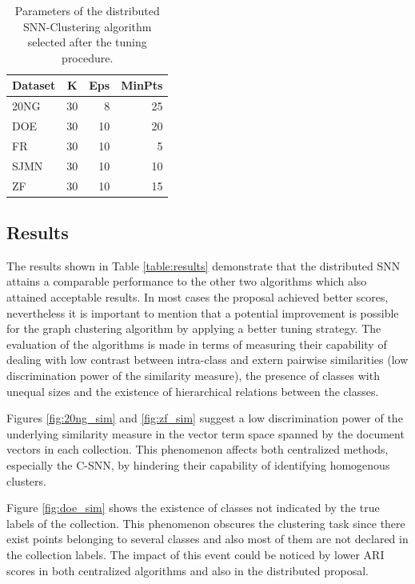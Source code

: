 \documentclass[a4paper]{article}
\begin{document}
\begin{table}[!htbp]
\centering
\begin{tabular}{l|crr}
\textbf{Dataset} & \textbf{K} & \textbf{Eps} & \textbf{MinPts} \\ \hline
20NG    & 30& 8 & 25 \\
DOE     & 30& 10& 20 \\
FR      & 30& 10& 5  \\
SJMN    & 30& 10& 10 \\
ZF      & 30& 10& 15 \\ \hline
\end{tabular}
\caption{Parameters of the distributed SNN-Clustering algorithm selected after the tuning procedure.}
\label{table:distributedsnn_params}
\end{table}


\subsection*{Results}
The results shown in Table \ref{table:results} demonstrate that the distributed SNN attains a comparable performance to the other two algorithms which also attained acceptable results. In most cases the proposal achieved better scores, nevertheless it is important to mention that a potential improvement is possible for the graph clustering algorithm by applying a better tuning strategy. 
The  evaluation of the algorithms is made in terms of measuring their capability of dealing with low contrast between intra-class and extern pairwise similarities (low discrimination power of the similarity measure), the presence of classes with unequal sizes and the existence of hierarchical relations between the classes.


Figures \ref{fig:20ng_sim} and \ref{fig:zf_sim} suggest a low discrimination power of the underlying similarity measure in the vector term space spanned by the document vectors in each collection. This phenomenon affects both centralized methods, especially the C-SNN, by hindering their capability of identifying homogenous clusters.

Figure \ref{fig:doe_sim} shows the existence of classes not indicated by the true labels of the collection. This phenomenon obscures the clustering task since there exist points belonging to several classes and also most of them are not declared in the collection labels. The impact of this event could be noticed by lower ARI scores in both centralized algorithms and also in the distributed proposal.
\end{document}

